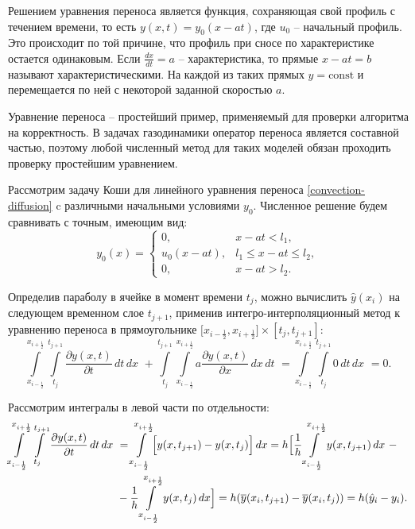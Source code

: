 \documentclass[12pt,a4paper]{article}
\newcommand{\half}{\frac{1}{2}}
\newcommand*{\Scale}[2][4]{\scalebox{#1}{$#2$}}
\begin{document}
    Решением уравнения переноса является функция, сохраняющая свой профиль с течением времени, то есть $ y(x, t) = y_0(x-at) $, где $ u_0 $ -- начальный профиль. Это происходит по той причине, что профиль при сносе по характеристике остается одинаковым. Если $\frac{dx}{dt} = a $ -- характеристика, то прямые $ x-at = b $ называют характеристическими. На каждой из таких прямых $ y = \text{const} $ и перемещается по ней с некоторой заданной скоростью $ a $. 

    Уравнение переноса – простейший пример, применяемый для проверки алгоритма на корректность. В задачах газодинамики оператор переноса является составной частью, поэтому любой численный метод для таких моделей обязан проходить проверку простейшим уравнением.

    Рассмотрим задачу Коши для линейного уравнения переноса \eqref{convection-diffusion} c различными начальными условиями $ y_0.$ Численное решение будем сравнивать с точным, имеющим вид: 
    \[  y_0(x) = 
         \begin{cases}
            0, & x - at < l_1, \\
            u_0(x-at), & l_1 \leq x-at \leq l_2, \\
            0, & x-at > l_2.
         \end{cases} 
    \]

    Определив параболу в ячейке в момент времени $ t_j $, можно вычислить $ \hat y(x_i) $ на следующем временном слое $ t_{j+1} $, применив интегро-интерполяционный метод к уравнению переноса в прямоугольнике $ \bigl[ x_{i-\half}, x_{i+\half} \bigr] \times [t_j, t_{j+1}] $: 
    \[
        \int \limits_{x_{i-\half}}^{x_{i+\half}} \int \limits_{t_j}^{t_{j+1}} \dfrac{ \partial y(x, t) }{ \partial t } \, dt \, dx \,\, + \int \limits_{t_j}^{t_{j+1}} \int \limits_{x_{i-\half}}^{x_{i+\half}} a \dfrac{ \partial y(x,t) }{ \partial x } \, dx \, dt \,\, = \int \limits_{x_{i-\half}}^{x_{i+\half}} \int \limits_{t_j}^{t_{j+1}} 0 \, dt \, dx \, \, = 0.
    \]

    Рассмотрим интегралы в левой части по отдельности: 
    \[
        \Scale[0.98] {
            \begin{split}
                \int \limits_{x_{i-\half}}^{x_{i+\half}} \int \limits_{t_j}^{t_{j+1}} \dfrac{ \partial y(x, t) }{ \partial t } \, dt \, dx \,\, &= \int \limits_{x_{i-\half}}^{x_{i+\half}} \Bigl[ y(x, t_{j+1}) - y(x, t_j)  \Bigr] \, dx = h \Bigl[ \dfrac{1}{h} \int \limits_{x_{i-\half}}^{x_{i+\half}} y(x, t_{j+1}) \, dx \,\,  -  \\ 
                &- \dfrac{1}{h} \int \limits_{x_{i-\half}}^{x_{i+\half}} y(x, t_j) \, dx \Bigr] = h ( \overline y(x_i, t_{j+1}) - \overline y(x_i, t_j) ) = h( \hat y_i - y_i).
            \end{split}
        }
    \]
\end{document}
